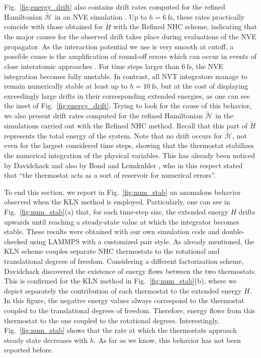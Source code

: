 \documentclass[
	aip,
	jcp,
	reprint,
]{revtex4-1}
\newcommand{\Ham}[1]{{\mathcal H}_\text{#1}}           %
\newcommand{\timestep}{h}
\newcommand{\refined}[1]{\widetilde{#1}}
\begin{document}
Fig.~\ref{fig:energy_drift} also contains drift rates computed for the refined Hamiltonian $\refined{\Ham{}}$ in an NVE simulation \cite{Silveira_2017}.
Up to $h = 6~\text{fs}$, these rates practically coincide with those obtained for $\refined H$ with the Refined NHC scheme, indicating that the major causes for the observed drift takes place during evaluations of the NVE propagator.
As the interaction potential we use is very smooth at cutoff, a possible cause is the amplification of round-off errors which can occur in events of close interatomic approaches \cite{Engle_2005}.
For time steps larger than $6~\text{fs}$, the NVE integration becomes fully unstable.
In contrast, all NVT integrators manage to remain numerically stable at least up to $h = 10~\text{fs}$, but at the cost of displaying exceedingly large drifts in their corresponding extended energies, as one can see the inset of Fig.~\ref{fig:energy_drift}.
Trying to look for the cause of this behavior, we also present drift rates computed for the refined Hamiltonian $\refined{\Ham{}}$ in the simulations carried out with the Refined NHC method.
Recall that this part of $\refined H$ represents the total energy of the system.
Note that no drift occurs for $\refined{\Ham{}}$, not even for the largest considered time steps, showing that the thermostat stabilizes the numerical integration of the physical variables.
This has already been noticed by Davidchack \cite{Davidchack_2010} and also by Bond and Leimkuhler \cite{Bond_2007}, who in this respect stated that ``the thermostat acts as a sort of reservoir for numerical errors''.

To end this section, we report in Fig.~\ref{fig:num_stab} an anomalous behavior observed when the KLN method \cite{Kamberaj_2005} is employed.
Particularly, one can see in Fig.~\ref{fig:num_stab}(a) that, for each time-step size, the extended energy $H$ drifts upwards until reaching a steady-state value at which the integrator becomes stable.
These results were obtained with our own simulation code and double-checked using LAMMPS \cite{Plimpton_1995} with a customized pair style.
As already mentioned, the KLN scheme \cite{Kamberaj_2005} couples separate NHC thermostats to the rotational and translational degrees of freedom.
Considering a different factorization scheme, Davidchack \cite{Davidchack_2010} discovered the existence of energy flows between the two thermostats.
This is confirmed for the KLN method \cite{Kamberaj_2005} in Fig.~\ref{fig:num_stab}(b), where we depict separately the contribution of each thermostat to the extended energy $H$.
In this figure, the negative energy values always correspond to the thermostat coupled to the translational degrees of freedom.
Therefore, energy flows from this thermostat to the one coupled to the rotational degrees.
Interestingly, Fig.~\ref{fig:num_stab} shows that the rate at which the thermostats approach steady state decreases with $\timestep$. As far as we know, this behavior has not been reported before.
\end{document}
